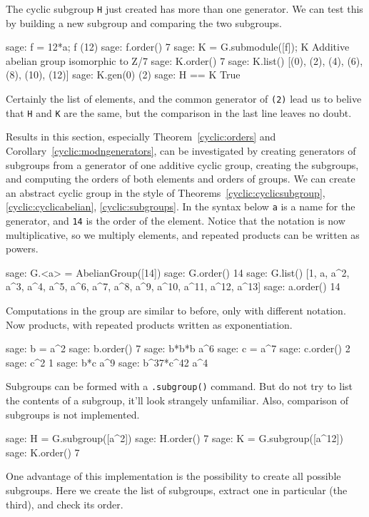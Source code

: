 %
The cyclic subgroup \verb?H? just created has more than one generator.  We can test this by building a new subgroup and comparing the two subgroups.
%
\begin{sageexample}
sage: f = 12*a; f
(12)
sage: f.order()
7
sage: K = G.submodule([f]); K
Additive abelian group isomorphic to Z/7
sage: K.order()
7
sage: K.list()
[(0), (2), (4), (6), (8), (10), (12)]
sage: K.gen(0)
(2)
sage: H == K
True
\end{sageexample}
%
Certainly the list of elements, and the common generator of \verb?(2)? lead us to belive that \verb?H? and \verb?K? are the same, but the comparison in the last line leaves no doubt.\par
%
Results in this section, especially Theorem~\ref{cyclic:orders} and Corollary~\ref{cyclic:modngenerators}, can be investigated by creating generators of subgroups from a generator of one additive cyclic group, creating the subgroups, and computing the orders of both elements and orders of groups.
%
%
We can create an abstract cyclic group in the style of Theorems~\ref{cyclic:cyclicsubgroup}, \ref{cyclic:cyclicabelian}, \ref{cyclic:subgroups}.  In the syntax below \verb?a? is a name for the generator, and \verb?14? is the order of the element.  Notice that the notation is now multiplicative, so we multiply elements, and repeated products can be written as powers.
%
\begin{sageexample}
sage: G.<a> = AbelianGroup([14])
sage: G.order()
14
sage: G.list()
[1, a, a^2, a^3, a^4, a^5, a^6, a^7, a^8, a^9, a^10, a^11, a^12, a^13]
sage: a.order()
14
\end{sageexample}
%
Computations in the group are similar to before, only with different notation.  Now products, with repeated products written as exponentiation.
%
\begin{sageexample}
sage: b = a^2
sage: b.order()
7
sage: b*b*b
a^6
sage: c = a^7
sage: c.order()
2
sage: c^2
1
sage: b*c
a^9
sage: b^37*c^42
a^4
\end{sageexample}
%
Subgroups can be formed with a \verb?.subgroup()? command.  But do not try to list the contents of a subgroup, it'll look strangely unfamiliar.  Also, comparison of subgroups is not implemented.
%
\begin{sageexample}
sage: H = G.subgroup([a^2])
sage: H.order()
7
sage: K = G.subgroup([a^12])
sage: K.order()
7
\end{sageexample}
%
One advantage of this implementation is the possibility to create all possible subgroups.  Here we create the list of subgroups, extract one in particular (the third), and check its order.
